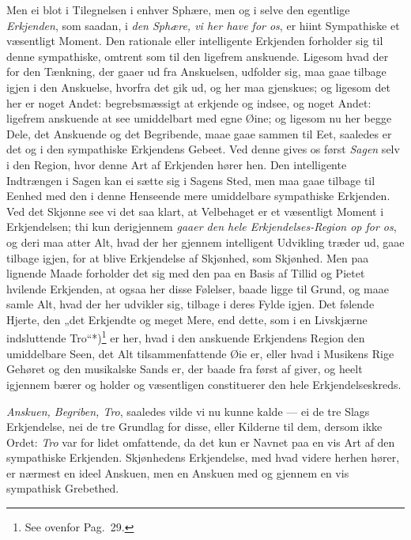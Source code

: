 \documentclass[12pt,a4paper]{book}
\newcommand{\apage}[1]{\marginnote{\footnotesize\textit{[#1]}}}
\begin{document}
%
Men ei blot i Tilegnelsen i enhver Sphære, men og i selve den egentlige
\emph{Erkjenden}, som saadan, i \emph{den Sphære, vi her have for os}, er hiint Sympathiske
et væsentligt Moment. Den rationale eller intelligente Erkjenden forholder sig
til denne sympathiske, omtrent som til den ligefrem anskuende. Ligesom hvad
der for den Tænkning, der gaaer ud fra Anskuelsen, udfolder sig, maa gaae
tilbage igjen i den Anskuelse, hvorfra det gik ud, og her maa gjenskues; og
ligesom det her er noget Andet: begrebsmæssigt at erkjende og indsee, og noget
Andet: ligefrem anskuende at see umiddelbart med egne Øine; og ligesom nu her
begge Dele, det Anskuende og det Begribende, maae gaae sammen til Eet,
saaledes er det og i den sympathiske Erkjendens Gebeet. Ved denne gives os
først \emph{Sagen} selv i den Region, hvor denne Art af Erkjenden hører hen. Den
intelligente Indtrængen i Sagen kan ei sætte sig i Sagens Sted, men maa gaae
tilbage til Eenhed med den i denne Henseende mere umiddelbare sympathiske
Erkjenden. Ved det Skjønne see vi det saa klart, at Velbehaget er et
væsentligt Moment i Erkjendelsen; thi kun derigjennem \emph{gaaer den hele
Erkjendelses-Region op for os}, og deri maa atter Alt, hvad der her gjennem
intelligent Udvikling træder ud, gaae tilbage igjen, for at blive Erkjendelse
af Skjønhed, som Skjønhed. Men paa lignende Maade forholder det sig med den
paa en Basis af Tillid og Pietet hvilende Erkjenden, at ogsaa her disse
Følelser, baade ligge til Grund, og maae samle Alt, hvad der her udvikler sig,
tilbage i deres Fylde igjen. Det følende Hjerte, den „det Erkjendte og meget
Mere, end dette, som i en Livskjærne indsluttende Tro“*)\footnote{See ovenfor
Pag.\ 29.} er her, hvad i den anskuende Erkjendens Region den umiddelbare
Seen, det Alt \apage{112} tilsammenfattende Øie er, eller hvad i Musikens Rige Gehøret og
den musikalske Sands er, der baade fra først af giver, og heelt igjennem bærer
og holder og væsentligen constituerer den hele Erkjendelseskreds.

\emph{Anskuen, Begriben, Tro}, saaledes vilde vi nu kunne kalde --- ei de tre Slags
Erkjendelse, nei de tre Grundlag for disse, eller Kilderne til dem, dersom
ikke Ordet: \emph{Tro} var for lidet omfattende, da det kun er Navnet paa en vis Art
af den sympathiske Erkjenden. Skjønhedens Erkjendelse, med hvad videre herhen
hører, er nærmest en ideel Anskuen, men en Anskuen med og gjennem en vis
sympathisk Grebethed.
\end{document}
